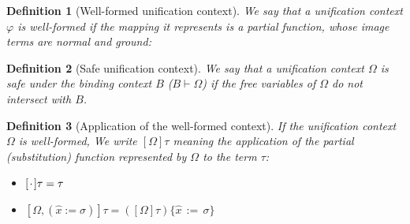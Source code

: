 \documentclass[a4,natbib=false]{article}
\newtheorem{definition}{Definition}
\newcommand{\subst}[3]{{#1}\{{#2}\,:=\,{#3}\}}
\newcommand{\ctxtapp}[2]{[{#1}] {#2}}
\newcommand{\evarassign}[2]{({#1} \mathsf{:=} {#2})}
\newcommand{\spcdot}{\mkern 2mu\cdot\mkern 2mu}
\newcommand{\emptyctx}{\spcdot}
\newcommand{\narg}[1]{|{#1}|}
\newcommand{\judgectx}[2]{{#1} \vdash {#2}}
\newcommand{\judgeSnf}[1]{{#1}\,\mathsf{NF}}
\newcommand{\judgeinst}[2]{{#1} \vdash {#2}}
\newcommand{\fullterm}[2]{{#1}\,#2_1 \dots #2_{\narg{#1}}}
\newcommand{\Infer}[3]{\inferrule*[right={#1}]{#2}{#3}}
\begin{document}


\begin{definition}[Well-formed unification context]
  We say that a unification context $\varphi$ is well-formed if the mapping it
  represents is a partial function, whose image terms are normal and ground:
\end{definition}

\begin{definition}[Safe unification context]
  We say that a unification context $\Omega$ is safe under the binding context $B$
  ($\judgectx{B}{\Omega}$)
  if the free variables of $\Omega$ do not intersect with $B$.
\end{definition}

\begin{definition}[Application of the well-formed context]
  If the unification context $\Omega$ is well-formed,
  We write $\ctxtapp{\Omega}{\tau}$ meaning the application of the partial
  (substitution) function represented by $\Omega$ to the term $\tau$:
  \begin{itemize}
  \item $\ctxtapp{\emptyctx}{\tau} = \tau$
  \item $\ctxtapp{\Omega, \evarassign{\hat{x}}{\sigma}}{\tau} = \subst{(\ctxtapp{\Omega}{\tau})}{\hat{x}}{\sigma}$
  \end{itemize}

\end{definition}
\end{document}
